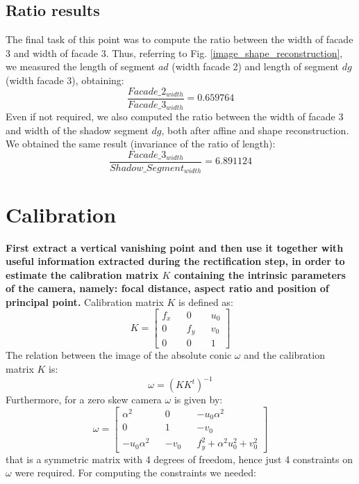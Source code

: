 \documentclass[11pt, oneside]{article}
\begin{document}
\subsection{Ratio results}
The final task of this point was to compute the ratio between the width of facade 3 and width of facade 3. Thus, referring to Fig. \ref{image_shape_reconstruction}, we measured the length of segment $ad$ (width facade 2) and length of segment $dg$ (width facade 3), obtaining:
$$\frac{Facade\_2_{width}}{Facade\_3_{width}} = 0.659764$$
Even if not required, we also computed the ratio between the width of facade 3 and width of the shadow segment $dg$, both after affine and shape reconstruction. We obtained the same result (invariance of the ratio of length):
$$\frac{Facade\_3_{width}}{Shadow\_Segment_{width}} = 6.891124$$


\section{Calibration}
\textbf{First extract a vertical vanishing point and then use it together with useful information extracted during the rectification step, in order to estimate the calibration matrix $K$ containing the intrinsic parameters of the camera, namely: focal distance, aspect ratio and position of principal point.} \hfill \break
Calibration matrix $K$ is defined as:
\begin{equation} \label{keq}
	K =
	\begin{bmatrix}
		f_x  && 0 && u_0 \\ 0 && f_y && v_0 \\ 0 && 0 && 1
	\end{bmatrix}
\end{equation}
The relation between the image of the absolute conic $\omega$ and the calibration matrix $K$ is:
\begin{equation}
	\label{eqn:omega_K}
	\omega = (KK^t)^{-1}
\end{equation}
Furthermore, for a zero skew camera $\omega$ is given by:
\begin{equation}
	\label{eqn:omega}
	\omega = 
	\begin{bmatrix}
		\alpha^2 && 0 && -u_0 \alpha^2 \\ 0 && 1 && -v_0 \\  -u_0 \alpha^2 && -v_0 && f_y^2 +\alpha^2 u_0^2 + v_0^2
	\end{bmatrix}
\end{equation}
that is a symmetric matrix with 4 degrees of freedom, hence just 4 constraints on $\omega$ were required. For computing the constraints we needed:
\end{document}
